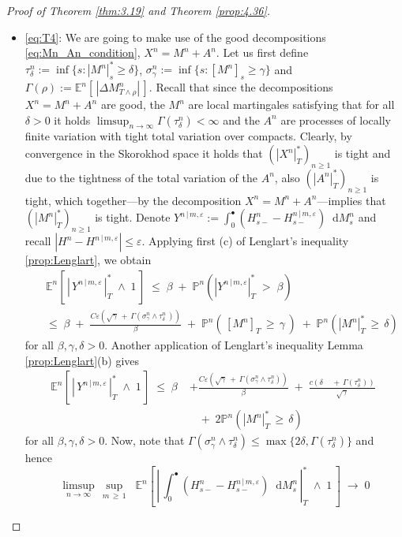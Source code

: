 \documentclass[11pt]{article}
\theoremstyle{definition}\newtheorem{example}[theorem]{Example}
\theoremstyle{definition}\newtheorem{counterexample}[theorem]{Counterexample}
\theoremstyle{definition}\newtheorem{remark}[theorem]{Remark}
\theoremstyle{definition}\newtheorem{defi}[theorem]{Definition}
\numberwithin{equation}{section}
\newcommand*\diff{\mathop{}\!\mathrm{d}}								%
\newcommand{\E}{\mathbb{E}}											%
\newcommand{\Pro}{\mathbb{P}}										%
\renewcommand{\sup}[1]{\underset{#1}{\operatorname{sup}}\;}					%
\renewcommand{\|}{\; : \, \;}											%
\begin{document}
\begin{proof}[Proof of Theorem \ref{thm:3.19} and Theorem \ref{prop:4.36}]
\begin{itemize}
		\item \eqref{eq:T4}: We are going to make use of the good decompositions \eqref{eq:Mn_An_condition}, $X^n=M^n+A^n$. Let us first define $\tau^n_\delta:=\operatorname{inf}\{s: |M^n|^*_s\ge \delta \}$, $\sigma^n_\gamma:=\operatorname{inf}\{s: [M^n]_s\ge \gamma\}$ and $\Gamma(\rho):=\E^n[\, |\Delta M^n_{T\wedge \rho}|\, ]$. Recall that since the decompositions $X^n=M^n+A^n$ are good, the $M^{n}$ are local martingales satisfying that for all $\delta>0$ it holds $\limsup_{n\to \infty} \Gamma(\tau^n_{\delta})< \infty$ and the $A^{n}$ are processes of locally finite variation with tight total variation over compacts. Clearly, by convergence in the Skorokhod space it holds that $(|X^n|_T^*)_{n\ge 1}$ is tight and due to the tightness of the total variation of the $A^n$, also $(|A^n|_T^*)_{n\ge 1}$ is tight, which together---by the decomposition $X^n=M^n+A^n$---implies that $(|M^n|_T^*)_{n\ge 1}$ is tight. Denote $Y^{n\, \vert \, m, \varepsilon}:= \int_0^\bullet (H^n_{s-}-H^{n\, \vert \, m, \varepsilon}_{s-}) \diff M^n_s$ and recall $|H^n-H^{n\, \vert \, m, \varepsilon}|\le \varepsilon$. Applying first (c) of Lenglart's inequality  \ref{prop:Lenglart}, we obtain
		\begin{align*}
			&\E^n \left[ \, \left| \, Y^{n\, \vert \, m, \varepsilon} \, \right|^*_T \; \wedge \; 1 \, \right] \; \le \; \beta \; + \; \Pro^n \left( |Y^{n\, \vert \, m, \varepsilon}|^*_T \; > \; \beta \right) \\
			\;\;&\le \; \beta \; + \; \frac{C\varepsilon (\sqrt{\gamma} \, + \, \Gamma(\sigma^n_{\gamma}\wedge \tau^n_\delta \,))}{\beta} \; + \; \Pro^n(\, [M^n]_T \, \ge \, \gamma \, ) \;+\; \Pro^n(|M^n|^*_T \, \ge \, \delta)
		\end{align*}
		for all $\beta,\gamma,\delta >0$. Another application of Lenglart's inequality Lemma \eqref{prop:Lenglart}(b) gives
		\begin{align*}\E^n \left[ \, \left| \, Y^{n\, \vert \, m, \varepsilon} \, \right|^*_T \; \wedge \; 1 \, \right] \; \le \; \beta \; &+
			  \frac{C\varepsilon(\sqrt{ \gamma} \, + \, \Gamma(\sigma^n_{\gamma}\wedge \tau^n_\delta))}{\beta} \; + \; \frac{c(\delta \, \quad + \, \Gamma(\tau^n_{\delta }))}{\sqrt{\gamma}} \; \\
			&\;\;\; + \; 2\Pro^n(|M^n|^*_T \, \ge \, \delta)
			\end{align*}
		for all $\beta, \gamma, \delta>0$. Now, note that $\Gamma(\sigma^n_{\gamma}\wedge \tau^n_\delta)\le \operatorname{max}\{2\delta,\Gamma(\tau^n_\delta)\}$ and hence
		$$ \limsup\limits_{n\to \infty} \, \sup{m \, \ge\, 1} \; \E^n \left[ \, \left| \, \int_0^\bullet (H^n_{s-}-H^{n\, \vert \, m, \varepsilon}_{s-}) \diff M^n_s\, \right|^*_T \; \wedge \; 1 \, \right] \; \longrightarrow \; 0$$

\end{itemize}
\end{proof}
\end{document}
